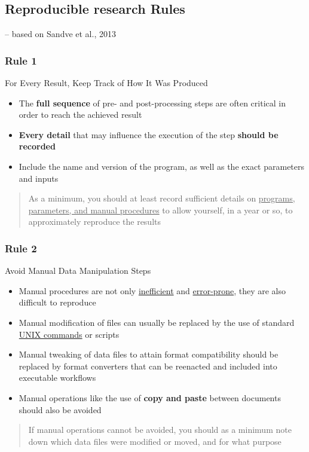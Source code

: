 \documentclass{beamer}
\begin{document}
\begin{frame}
\section{Reproducible research Rules}
\vspace{30pt}
\scriptsize  
\raggedleft -- based on Sandve et al., 2013 \citep{Sandve:2013gh}
\end{frame}
\begin{frame}
\frametitle{Rule 1}
{\sc For Every Result, Keep Track of How It Was Produced}
\pause
\begin{itemize}
	\item The \textbf{full sequence} of pre- and post-processing steps are often critical in order to reach the achieved result
	\item \textbf{Every detail} that may influence the execution of the step \textbf{should be recorded}
    \item Include the name and version of the program, as well as the exact parameters and inputs
\end{itemize}
\begin{quote}As a minimum, you should at least record sufficient details on \underline{programs, parameters, and manual procedures} to allow yourself, in a year or so, to approximately reproduce the results\end{quote}
\end{frame}
\begin{frame}
\frametitle{Rule 2}
{\sc Avoid Manual Data Manipulation Steps}
\pause
\begin{itemize}
	\item Manual procedures are not only \underline{inefficient} and \underline{error-prone}, they are also difficult to reproduce
	\item Manual modification of files can usually be replaced by the use of standard \underline{UNIX commands} or scripts
	\item Manual tweaking of data files to attain format compatibility should be replaced by format converters that can be reenacted and included into executable workflows
	\item Manual operations like the use of \textbf{copy and paste} between documents should also be avoided
\end{itemize}
\begin{quote}
If manual operations cannot be avoided, you should as a minimum note down which data files were modified or moved, and for what purpose
\end{quote}

\end{frame}
\end{document}
